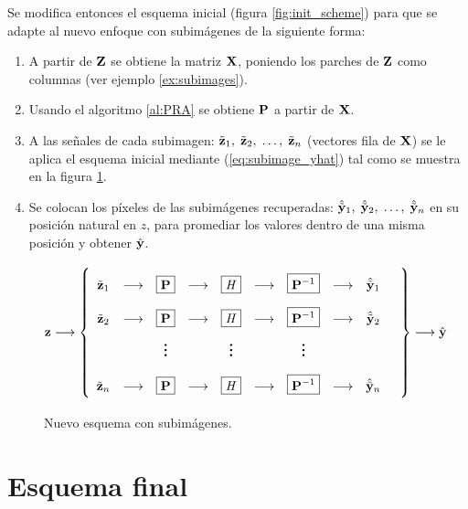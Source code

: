 Se modifica entonces el esquema inicial (figura \ref{fig:init_scheme}) para que se adapte al nuevo enfoque con subim\'agenes de la siguiente forma:
\begin{enumerate}
	\item A partir de $\Z$ se obtiene la matriz $\X$, poniendo los parches de $\Z$ como columnas (ver ejemplo \ref{ex:subimages}).
	\item Usando el algoritmo \ref{al:PRA} se obtiene $\P$ a partir de $\X$.
	\item A las señales de cada subimagen: $\ztilde_1,\; \ztilde_2,\; \dots,\; \ztilde_n$ (vectores fila de $\X$) se le aplica el esquema inicial mediante (\ref{eq:subimage_yhat}) tal como se muestra en la figura \ref{fig:subimage_scheme}.
	\item Se colocan los p\'ixeles de las subim\'agenes recuperadas: $\yhattilde_1,\; \yhattilde_2,\; \dots,\; \yhattilde_n$ en su posici\'on natural en $z$, para promediar los valores dentro de una misma posici\'on y obtener $\yhat$.
\end{enumerate}

\begin{figure}[H]
	\begin{equation*}
		\z\longrightarrow\left\{
		\def\arraystretch{2.2}
		\begin{array}{ccccccccccc}
			\ztilde_1 & \longrightarrow & \boxed{\P} & \longrightarrow & \boxed{\H} & \longrightarrow & \boxed{\P^{-1}} & \longrightarrow & \yhattilde_1\\
			\ztilde_2 & \longrightarrow & \boxed{\P} & \longrightarrow & \boxed{\H} & \longrightarrow & \boxed{\P^{-1}} & \longrightarrow & \yhattilde_2\\
			& & \huge\vdots &  & \huge\vdots &  & \huge\vdots & & & \\
			\ztilde_n & \longrightarrow & \boxed{\P} & \longrightarrow & \boxed{\H} & \longrightarrow & \boxed{\P^{-1}} & \longrightarrow & \yhattilde_n\\
		\end{array}
		\right\}\longrightarrow\yhat
	\end{equation*}
	\caption{Nuevo esquema con subim\'agenes.}
	\label{fig:subimage_scheme}
\end{figure}

\section{Esquema final}\label{sec:final_scheme}

